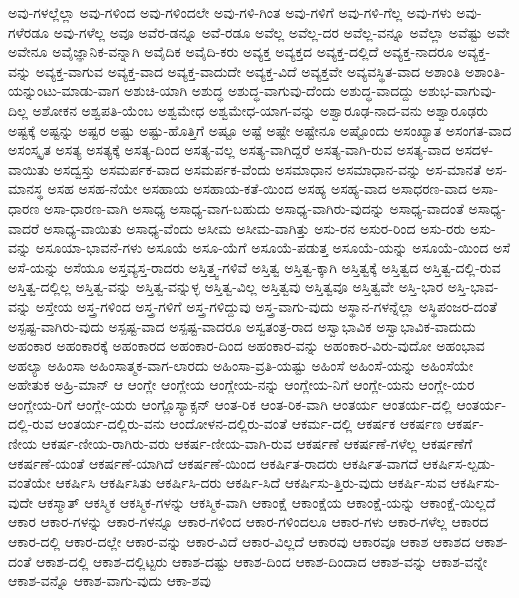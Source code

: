 {ಅವು-ಗಳಲ್ಲೆಲ್ಲಾ
ಅವು-ಗಳಿಂದ
ಅವು-ಗಳಿಂದಲೇ
ಅವು-ಗಳಿ-ಗಿಂತ
ಅವು-ಗಳಿಗೆ
ಅವು-ಗಳಿ-ಗೆಲ್ಲ
ಅವು-ಗಳು
ಅವು-ಗಳೆರಡೂ
ಅವು-ಗಳೆಲ್ಲ
ಅವೂ
ಅವೆರ-ಡನ್ನೂ
ಅವೆ-ರಡೂ
ಅವೆಲ್ಲ
ಅವೆಲ್ಲ-ದರ
ಅವೆಲ್ಲ-ವನ್ನೂ
ಅವೆಲ್ಲಾ
ಅವೆಷ್ಟು
ಅವೇ
ಅವೇನೂ
ಅವೈಜ್ಞಾನಿಕ-ವನ್ನಾಗಿ
ಅವೈದಿಕ
ಅವೈದಿ-ಕರು
ಅವ್ಯಕ್ತ
ಅವ್ಯಕ್ತದ
ಅವ್ಯಕ್ತ-ದಲ್ಲಿದೆ
ಅವ್ಯಕ್ತ-ನಾದರೂ
ಅವ್ಯಕ್ತ-ವನ್ನು
ಅವ್ಯಕ್ತ-ವಾಗುವ
ಅವ್ಯಕ್ತ-ವಾದ
ಅವ್ಯಕ್ತ-ವಾದುದೇ
ಅವ್ಯಕ್ತ-ವಿದೆ
ಅವ್ಯಕ್ತವೇ
ಅವ್ಯವಸ್ಥಿತ-ವಾದ
ಅಶಾಂತಿ
ಅಶಾಂತಿ-ಯನ್ನುಂಟು-ಮಾಡು-ವಾಗ
ಅಶುಚಿ-ಯಾಗಿ
ಅಶುದ್ಧ
ಅಶುದ್ಧ-ವಾಗುವು-ದೆಂದು
ಅಶುದ್ಧ-ವಾದದ್ದು
ಅಶುಭ-ವಾಗುವು-ದಿಲ್ಲ
ಅಶೋಕನ
ಅಶ್ವಪತಿ-ಯೆಂಬ
ಅಶ್ವಮೇಧ
ಅಶ್ವಮೇಧ-ಯಾಗ-ವನ್ನು
ಅಶ್ವಾರೂಢ-ನಾದ-ವನು
ಅಶ್ವಾರೂಢರು
ಅಷ್ಟಕ್ಕೆ
ಅಷ್ಟನ್ನು
ಅಷ್ಟರ
ಅಷ್ಟು
ಅಷ್ಟು-ಹೊತ್ತಿಗೆ
ಅಷ್ಟೂ
ಅಷ್ಟೆ
ಅಷ್ಟೇ
ಅಷ್ಟೇನೂ
ಅಷ್ಟೊಂದು
ಅಸಂಖ್ಯಾತ
ಅಸಂಗತ-ವಾದ
ಅಸಂಸ್ಕೃತ
ಅಸತ್ಯ
ಅಸತ್ಯಕ್ಕೆ
ಅಸತ್ಯ-ದಿಂದ
ಅಸತ್ಯ-ವಲ್ಲ
ಅಸತ್ಯ-ವಾಗಿದ್ದರೆ
ಅಸತ್ಯ-ವಾಗಿ-ರುವ
ಅಸತ್ಯ-ವಾದ
ಅಸದಳ-ವಾಯಿತು
ಅಸದ್ವಸ್ತು
ಅಸಮರ್ಪಕ-ವಾದ
ಅಸಮರ್ಪಕ-ವೆಂದು
ಅಸಮಾಧಾನ
ಅಸಮಾಧಾನ-ವನ್ನು
ಅಸ-ಮಾನತೆ
ಅಸ-ಮಾನಸ್ಥ
ಅಸಹ
ಅಸಹ-ನೆಯೇ
ಅಸಹಾಯ
ಅಸಹಾಯ-ಕತೆ-ಯಿಂದ
ಅಸಹ್ಯ
ಅಸಹ್ಯ-ವಾದ
ಅಸಾಧರಣ-ವಾದ
ಅಸಾ-ಧಾರಣ
ಅಸಾ-ಧಾರಣ-ವಾಗಿ
ಅಸಾಧ್ಯ
ಅಸಾಧ್ಯ-ವಾಗ-ಬಹುದು
ಅಸಾಧ್ಯ-ವಾಗಿರು-ವುದನ್ನು
ಅಸಾಧ್ಯ-ವಾದಂತೆ
ಅಸಾಧ್ಯ-ವಾದರೆ
ಅಸಾಧ್ಯ-ವಾಯಿತು
ಅಸಾಧ್ಯ-ವೆಂದು
ಅಸೀಮ
ಅಸೀಮ-ವಾಗಿತ್ತು
ಅಸು-ರನ
ಅಸುರ-ರಿಂದ
ಅಸು-ರರು
ಅಸು-ವನ್ನು
ಅಸೂಯಾ-ಭಾವನೆ-ಗಳು
ಅಸೂಯೆ
ಅಸೂ-ಯೆಗೆ
ಅಸೂಯೆ-ಪಡುತ್ತ
ಅಸೂಯೆ-ಯನ್ನು
ಅಸೂಯೆ-ಯಿಂದ
ಅಸೆ
ಅಸೆ-ಯನ್ನು
ಅಸೆಯೂ
ಅಸ್ತವ್ಯಸ್ತ-ರಾದರು
ಅಸ್ತಿತ್ತ್ವ-ಗಳಿವೆ
ಅಸ್ತಿತ್ವ
ಅಸ್ತಿತ್ವ-ಕ್ಕಾಗಿ
ಅಸ್ತಿತ್ವಕ್ಕೆ
ಅಸ್ತಿತ್ವದ
ಅಸ್ತಿತ್ವ-ದಲ್ಲಿ-ರುವ
ಅಸ್ತಿತ್ವ-ದಲ್ಲಿಲ್ಲ
ಅಸ್ತಿತ್ವ-ವನ್ನು
ಅಸ್ತಿತ್ವ-ವನ್ನುಳ್ಳ
ಅಸ್ತಿತ್ವ-ವಿಲ್ಲ
ಅಸ್ತಿತ್ವವು
ಅಸ್ತಿತ್ವವೂ
ಅಸ್ತಿತ್ವವೇ
ಅಸ್ತಿ-ಭಾರ
ಅಸ್ತಿ-ಭಾವ-ವನ್ನು
ಅಸ್ತೇಯ
ಅಸ್ತ್ರ-ಗಳಿಂದ
ಅಸ್ತ್ರ-ಗಳಿಗೆ
ಅಸ್ತ್ರ-ಗಳಿದ್ದುವು
ಅಸ್ತ್ರ-ವಾಗು-ವುದು
ಅಸ್ಥಾನ-ಗಳನ್ನೆಲ್ಲಾ
ಅಸ್ಥಿಪಂಜರ-ದಂತೆ
ಅಸ್ಪಷ್ಟ-ವಾಗಿರು-ವುದು
ಅಸ್ಪಷ್ಟ-ವಾದ
ಅಸ್ಪಷ್ಟ-ವಾದರೂ
ಅಸ್ವತಂತ್ರ-ರಾದ
ಅಸ್ವಾಭಾವಿಕ
ಅಸ್ವಾಭಾವಿಕ-ವಾದುದು
ಅಹಂಕಾರ
ಅಹಂಕಾರಕ್ಕೆ
ಅಹಂಕಾರದ
ಅಹಂಕಾರ-ದಿಂದ
ಅಹಂಕಾರ-ವನ್ನು
ಅಹಂಕಾರ-ವಿರು-ವುದೋ
ಅಹಂಭಾವ
ಅಹಲ್ಯಾ
ಅಹಿಂಸಾ
ಅಹಿಂಸಾತ್ಮಕ-ವಾಗ-ಲಾರದು
ಅಹಿಂಸಾ-ವ್ರತಿ-ಯಷ್ಟು
ಅಹಿಂಸೆ
ಅಹಿಂಸೆ-ಯನ್ನು
ಅಹಿಂಸೆಯೇ
ಅಹೇತುಕ
ಅಹ್ರಿ-ಮಾನ್
ಆ
ಆಂಗ್ಲೇ
ಆಂಗ್ಲೇಯ
ಆಂಗ್ಲೇಯ-ನನ್ನು
ಆಂಗ್ಲೇಯ-ನಿಗೆ
ಆಂಗ್ಲೇ-ಯನು
ಆಂಗ್ಲೇ-ಯರ
ಆಂಗ್ಲೇಯ-ರಿಗೆ
ಆಂಗ್ಲೇ-ಯರು
ಆಂಗ್ಲೊಸ್ಯಾಕ್ಸನ್
ಆಂತ-ರಿಕ
ಆಂತ-ರಿಕ-ವಾಗಿ
ಆಂತರ್ಯ
ಆಂತರ್ಯ-ದಲ್ಲಿ
ಆಂತರ್ಯ-ದಲ್ಲಿ-ರುವ
ಆಂತರ್ಯ-ದಲ್ಲಿರು-ವನು
ಆಂದೋಳನ-ದಲ್ಲಿರು-ವಂತೆ
ಆಕರ್ಮ-ದಲ್ಲಿ
ಆಕರ್ಷಕ
ಆಕರ್ಷಣ
ಆಕರ್ಷ-ಣೀಯ
ಆಕರ್ಷ-ಣೀಯ-ರಾಗಿರು-ವರು
ಆಕರ್ಷ-ಣೀಯ-ವಾಗಿ-ರುವ
ಆಕರ್ಷಣೆ
ಆಕರ್ಷಣೆ-ಗಳೆಲ್ಲ
ಆಕರ್ಷಣೆಗೆ
ಆಕರ್ಷಣೆ-ಯಂತೆ
ಆಕರ್ಷಣೆ-ಯಾಗಿದೆ
ಆಕರ್ಷಣೆ-ಯಿಂದ
ಆಕರ್ಷಿತ-ರಾದರು
ಆಕರ್ಷಿತ-ವಾಗದೆ
ಆಕರ್ಷಿಸ-ಲ್ಪಡು-ವಂತೆಯೇ
ಆಕರ್ಷಿಸಿ
ಆಕರ್ಷಿಸಿತು
ಆಕರ್ಷಿಸಿ-ದರು
ಆಕರ್ಷಿ-ಸಿದೆ
ಆಕರ್ಷಿಸು-ತ್ತಿರು-ವುದು
ಆಕರ್ಷಿ-ಸುವ
ಆಕರ್ಷಿಸು-ವುದೇ
ಆಕಸ್ಮಾತ್
ಆಕಸ್ಮಿಕ
ಆಕಸ್ಮಿಕ-ಗಳನ್ನು
ಆಕಸ್ಮಿಕ-ವಾಗಿ
ಆಕಾಂಕ್ಷೆ
ಆಕಾಂಕ್ಷೆಯ
ಆಕಾಂಕ್ಷೆ-ಯನ್ನು
ಆಕಾಂಕ್ಷೆ-ಯಿಲ್ಲದೆ
ಆಕಾರ
ಆಕಾರ-ಗಳನ್ನು
ಆಕಾರ-ಗಳನ್ನೂ
ಆಕಾರ-ಗಳಿಂದ
ಆಕಾರ-ಗಳಿಂದಲೂ
ಆಕಾರ-ಗಳು
ಆಕಾರ-ಗಳೆಲ್ಲ
ಆಕಾರದ
ಆಕಾರ-ದಲ್ಲಿ
ಆಕಾರ-ದಲ್ಲೇ
ಆಕಾರ-ವನ್ನು
ಆಕಾರ-ವಿದೆ
ಆಕಾರ-ವಿಲ್ಲದೆ
ಆಕಾರವು
ಆಕಾರವೂ
ಆಕಾಶ
ಆಕಾಶದ
ಆಕಾಶ-ದಂತೆ
ಆಕಾಶ-ದಲ್ಲಿ
ಆಕಾಶ-ದಲ್ಲಿಟ್ಟರು
ಆಕಾಶ-ದಷ್ಟು
ಆಕಾಶ-ದಿಂದ
ಆಕಾಶ-ದಿಂದಾದ
ಆಕಾಶ-ವನ್ನು
ಆಕಾಶ-ವನ್ನೇ
ಆಕಾಶ-ವನ್ನೊ
ಆಕಾಶ-ವಾಗು-ವುದು
ಆಕಾ-ಶವು
}
